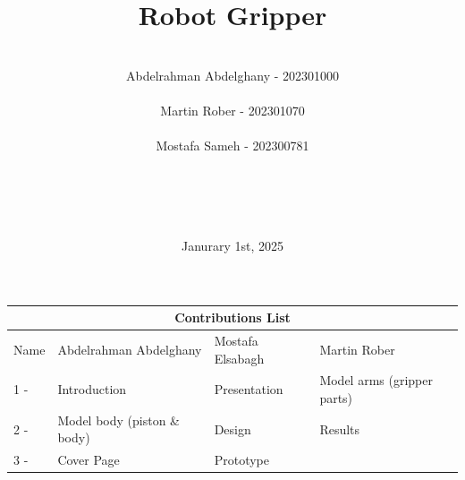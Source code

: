 \documentclass{article}
\title{Robot Gripper}
\author{ \\ Abdelrahman Abdelghany - 202301000 \\ \\ Martin Rober - 202301070 \\ \\ Mostafa Sameh - 202300781 \\ \\ \\ \\ \\  }
\date{Janurary 1st, 2025}
\begin{document}
\maketitle

\newpage
\begin{tabular}{ |p{1cm}||p{5cm}|p{3cm}|p{3cm}|}
    \hline
    \multicolumn{4}{|c|}{Contributions List} \\
    \hline
    Name & Abdelrahman Abdelghany & Mostafa Elsabagh & Martin Rober \\
    \hline
   
   1 - & Introduction & Presentation & Model arms (gripper parts) \\
   2 - & Model body (piston \& body)  & Design & Results \\
   3 - & Cover Page  & Prototype & \\
    \hline
   \end{tabular}
   \newpage

\newpage
\end{document}
